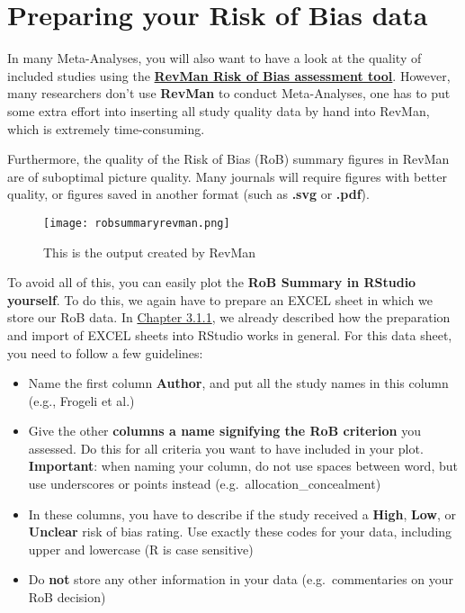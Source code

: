 \documentclass[]{book}
\providecommand{\tightlist}{%
  \setlength{\itemsep}{0pt}\setlength{\parskip}{0pt}}
\theoremstyle{definition}
\theoremstyle{definition}
\theoremstyle{definition}
\theoremstyle{remark}
\begin{document}
\section{Preparing your Risk of Bias
data}\label{preparing-your-risk-of-bias-data}

In many Meta-Analyses, you will also want to have a look at the quality
of included studies using the
\href{https://handbook-5-1.cochrane.org/chapter_8/8_6_presentation_of_assessments_of_risk_of_bias.htm}{\textbf{RevMan
Risk of Bias assessment tool}}. However, many researchers don't use
\textbf{RevMan} to conduct Meta-Analyses, one has to put some extra
effort into inserting all study quality data by hand into RevMan, which
is extremely time-consuming.

Furthermore, the quality of the Risk of Bias (RoB) summary figures in
RevMan are of suboptimal picture quality. Many journals will require
figures with better quality, or figures saved in another format (such as
\textbf{.svg} or \textbf{.pdf}).

\begin{figure}
\centering
\texttt{[image: robsummaryrevman.png]}
\caption{This is the output created by RevMan}
\end{figure}

To avoid all of this, you can easily plot the \textbf{RoB Summary in
RStudio yourself}. To do this, we again have to prepare an EXCEL sheet
in which we store our RoB data. In
\protect\hyperlink{excel_preparation}{Chapter 3.1.1}, we already
described how the preparation and import of EXCEL sheets into RStudio
works in general. For this data sheet, you need to follow a few
guidelines:

\begin{itemize}
\tightlist
\item
  Name the first column \textbf{Author}, and put all the study names in
  this column (e.g., Frogeli et al.)
\item
  Give the other \textbf{columns a name signifying the RoB criterion}
  you assessed. Do this for all criteria you want to have included in
  your plot. \textbf{Important}: when naming your column, do not use
  spaces between word, but use underscores or points instead
  (e.g.~allocation\_concealment)
\item
  In these columns, you have to describe if the study received a
  \textbf{High}, \textbf{Low}, or \textbf{Unclear} risk of bias rating.
  Use exactly these codes for your data, including upper and lowercase
  (R is case sensitive)
\item
  Do \textbf{not} store any other information in your data
  (e.g.~commentaries on your RoB decision)
\end{itemize}
\end{document}

